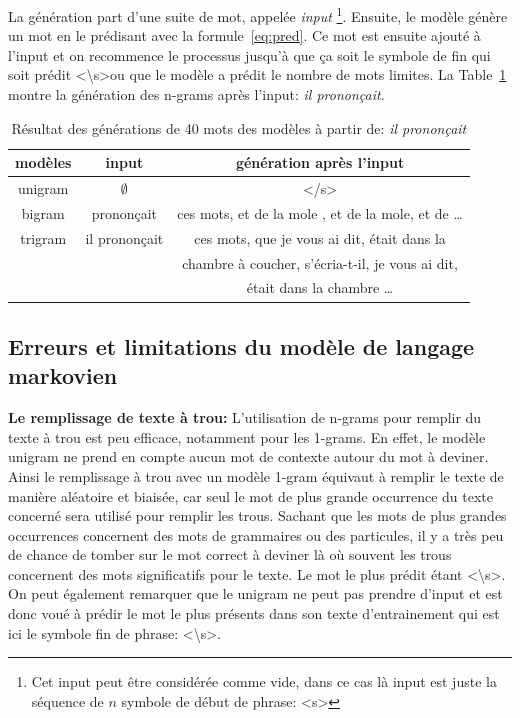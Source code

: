 \documentclass[a4paper]{article}
\begin{document}
La génération part d'une suite de mot, appelée \textit{input}
\footnote{Cet input peut être considérée comme vide, dans ce cas là input est juste la séquence de $n$ symbole de début de phrase:
\textless s\textgreater}.
Ensuite, le modèle génère un mot en le prédisant avec la formule~\ref{eq:pred}. Ce mot est ensuite ajouté à l'input et
on recommence le processus jusqu'à que ça soit le symbole de fin qui soit prédit \textless \textbackslash s\textgreater ou que le modèle a prédit le nombre 
de mots limites. La Table~\ref{tab:generate} montre la génération des n-grams après l'input: \textit{il prononçait}.

\begin{table}[ht]
    \centering
    \begin{tabular}{|c|c|c|}
        \hline
        modèles & input & génération après l'input \\
        \hline
        unigram & $\emptyset$ & </s> \\
        \hline
        bigram & prononçait & ces mots, et de la mole , et de la mole, et de \dots\\
        \hline
        trigram & il prononçait & ces mots, que je vous ai dit, était dans la\\
         & &  chambre à coucher, s'écria-t-il, je vous ai dit,\\
         & &  était dans la chambre \dots\\
        \hline
    \end{tabular}
    \caption{Résultat des générations de 40 mots des modèles à partir de: \textit{il prononçait}}
    \label{tab:generate}
  \end{table}

\subsection{Erreurs et limitations du modèle de langage markovien}

\textbf{Le remplissage de texte à trou:} 
L'utilisation de n-grams pour remplir du texte à trou est peu efficace, notamment pour les 1-grams. En effet, le modèle 
unigram ne prend en compte aucun mot de contexte autour du mot à deviner. Ainsi le remplissage à trou avec un modèle 1-gram 
équivaut à remplir le texte de manière aléatoire et biaisée, car seul le mot de plus grande occurrence du texte concerné sera 
utilisé pour remplir les trous. Sachant que les mots de plus grandes occurrences concernent des mots de grammaires ou des 
particules, il y a très peu de chance de tomber sur le mot correct à deviner là où souvent les trous concernent des mots 
significatifs pour le texte. Le mot le plus prédit étant \textless \textbackslash s\textgreater. On peut également remarquer que le unigram ne peut pas prendre d'input et est donc voué à prédir le mot le plus présents dans son texte d'entrainement qui est ici le symbole fin de phrase: \textless \textbackslash s\textgreater.
\end{document}

